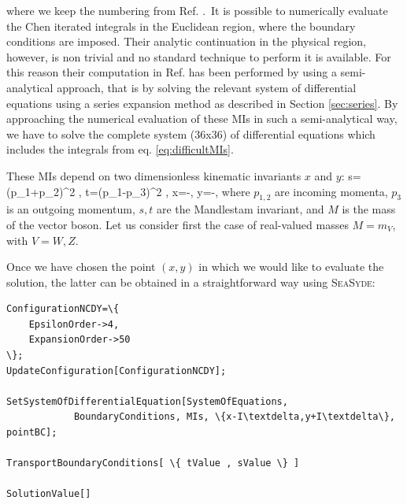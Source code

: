 \documentclass[final,1p,times]{elsarticle}
\begin{document}
where we keep the numbering from Ref. \cite{Armadillo:2022bgm}.\
It is possible to numerically evaluate the Chen iterated integrals in the Euclidean region, where the boundary conditions are imposed.
Their analytic continuation in the physical region, however, is non trivial and no standard technique to perform it is available. For this reason their computation in Ref.\cite{Armadillo:2022bgm} has been performed by using a semi-analytical approach, that is by solving the relevant system of differential equations using a series expansion method as described in Section \ref{sec:series}. 
By approaching the numerical evaluation of these MIs in such a semi-analytical way, we have to solve the complete system (36x36) of differential equations which includes the integrals from eq. \ref{eq:difficultMIs}.

These MIs depend on two dimensionless kinematic invariants
$x$ and $y$:
\be
    s=(p_1+p_2)^2 \;,\qquad
    t=(p_1-p_3)^2 \;,\qquad
    x=-\;,\qquad
    y=-\;,
    \label{eq:kinVariablesReal}
\ee
where $p_{1,2}$ are incoming momenta, $p_3$ is an outgoing momentum, $s,t$ are the Mandlestam invariant, and
$M$ is the mass of the vector boson.
Let us consider first the case of real-valued masses $M=m_V$, with $V=W,Z$.

Once we have chosen the point $(x,y)$
in which we would like to evaluate the solution, the latter can be obtained in a straightforward way
using \textsc{SeaSyde}:
\begin{Verbatim}[commandchars=\\\{\}] 
ConfigurationNCDY=\{                               
	EpsilonOrder->4,                               
	ExpansionOrder->50                                 
\};                                                      
UpdateConfiguration[ConfigurationNCDY];

SetSystemOfDifferentialEquation[SystemOfEquations, 
	        BoundaryConditions, MIs, \{x-I\textdelta,y+I\textdelta\}, pointBC]; 

TransportBoundaryConditions[ \{ tValue , sValue \} ]

SolutionValue[]
\end{Verbatim}
\end{document}
